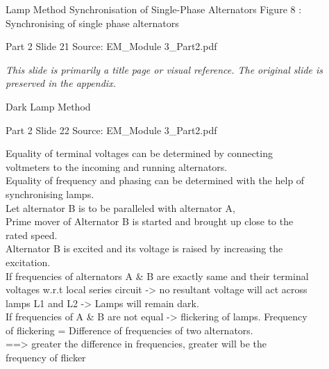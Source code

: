 \documentclass[11pt,a4paper]{article}
\begin{document}
\begin{mdframed}[roundcorner=9pt,backgroundcolor=white,linecolor=anthBlue,linewidth=1pt,innerleftmargin=12pt,innerrightmargin=12pt,innertopmargin=10pt,innerbottommargin=10pt,skipabove=8pt,skipbelow=10pt]
{\HeadingFont\fontsize{15}{18}\selectfont\color{anthDark}Lamp Method Synchronisation of Single-Phase Alternators Figure 8 : Synchronising of single phase alternators\par}
{\color{anthMid}\small Part 2 \textbullet{} Slide 21 \textbullet{} Source: EM\_Module 3\_Part2.pdf\par}
\vspace{0.5em}
{\small
\textit{This slide is primarily a title page or visual reference. The original slide is preserved in the appendix.}

}
\end{mdframed}

\begin{mdframed}[roundcorner=9pt,backgroundcolor=white,linecolor=anthGreen,linewidth=1pt,innerleftmargin=12pt,innerrightmargin=12pt,innertopmargin=10pt,innerbottommargin=10pt,skipabove=8pt,skipbelow=10pt]
{\HeadingFont\fontsize{15}{18}\selectfont\color{anthDark}Dark Lamp Method\par}
{\color{anthMid}\small Part 2 \textbullet{} Slide 22 \textbullet{} Source: EM\_Module 3\_Part2.pdf\par}
\vspace{0.5em}
{\small
Equality of terminal voltages can be determined by connecting\\
voltmeters to the incoming and running alternators.\\
Equality of frequency and phasing can be determined with the help of\\
synchronising lamps.\\
Let alternator B is to be paralleled with alternator A,\\
Prime mover of Alternator B is started and brought up close to the\\
rated speed.\\
Alternator B is excited and its voltage is raised by increasing the\\
excitation.\\
If frequencies of alternators A \& B are exactly same and their terminal\\
voltages w.r.t local series circuit -> no resultant voltage will act across\\
lamps L1 and L2 -> Lamps will remain dark.\\
If frequencies of A \& B are not equal -> flickering of lamps. Frequency\\
of flickering = Difference of frequencies of two alternators.\\
==> greater the difference in frequencies, greater will be the\\
frequency of flicker\\

}
\end{mdframed}
\end{document}
